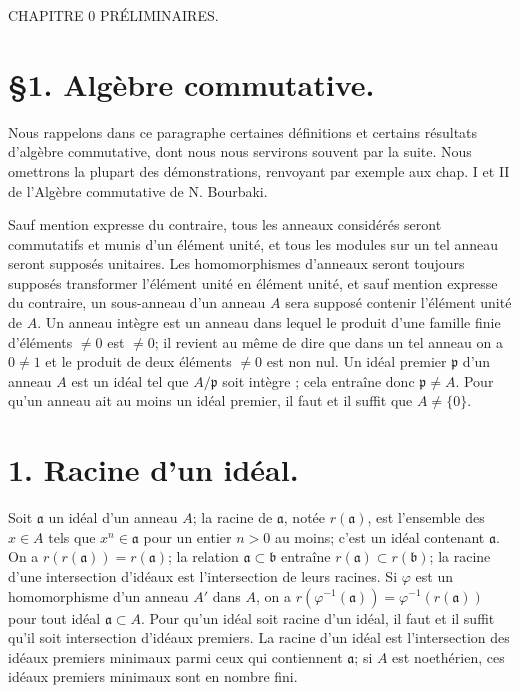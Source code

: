 

\hfill {}

\begin{center}
CHAPITRE 0
PRÉLIMINAIRES.
\end{center}

\section*{§1. Algèbre commutative.}

Nous rappelons dans ce paragraphe certaines définitions et certains résultats d'algèbre commutative, dont nous nous servirons souvent par la suite. Nous omettrons la plupart des démonstrations, renvoyant par exemple aux chap. I et II de l'Algèbre commutative de N. Bourbaki.

Sauf mention expresse du contraire, tous les anneaux considérés seront commutatifs et munis d'un élément unité, et tous les modules sur un tel anneau seront supposés unitaires. Les homomorphismes d'anneaux seront toujours supposés transformer l'élément unité en élément unité, et sauf mention expresse du contraire, un sous-anneau d'un anneau $A$ sera supposé contenir l'élément unité de $A$. Un anneau intègre est un anneau dans lequel le produit d'une famille finie d'éléments $\neq 0$ est $\neq 0$; il revient au même de dire que dans un tel anneau on a $0 \neq 1$ et le produit de deux éléments $\neq 0$ est non nul. Un idéal premier $\mathfrak{p}$ d'un anneau $A$ est un idéal tel que $A/\mathfrak{p}$ soit intègre ; cela entraîne donc $\mathfrak{p} \neq A$. Pour qu'un anneau ait au moins un idéal premier, il faut et il suffit que $A \neq \{0\}$.

\section*{1. Racine d'un idéal.}

Soit $\mathfrak{a}$ un idéal d'un anneau $A$; la racine de $\mathfrak{a}$, notée $r(\mathfrak{a})$, est l'ensemble des $x \in A$ tels que $x^n \in \mathfrak{a}$ pour un entier $n > 0$ au moins; c'est un idéal contenant $\mathfrak{a}$. On a $r(r(\mathfrak{a})) = r(\mathfrak{a})$; la relation $\mathfrak{a} \subset \mathfrak{b}$ entraîne $r(\mathfrak{a}) \subset r(\mathfrak{b})$; la racine d'une intersection d'idéaux est l'intersection de leurs racines. Si $\varphi$ est un homomorphisme d'un anneau $A'$ dans $A$, on a $r(\varphi^{-1}(\mathfrak{a})) = \varphi^{-1}(r(\mathfrak{a}))$ pour tout idéal $\mathfrak{a} \subset A$. Pour qu'un idéal soit racine d'un idéal, il faut et il suffit qu'il soit intersection d'idéaux premiers. La racine d'un idéal est l'intersection des idéaux premiers minimaux parmi ceux qui contiennent $\mathfrak{a}$; si $A$ est noethérien, ces idéaux premiers minimaux sont en nombre fini.

